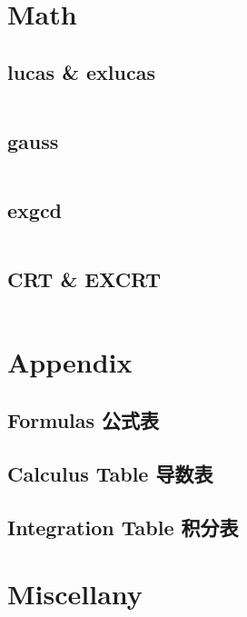 \documentclass[titlepage, a4paper]{article}
\begin{document}
\begin{multicols}{2}
\begin{spacing}{0.6}
			\section{Math}
				\subsection{lucas \& exlucas}
					\inputminted{cpp}{src/Math Combinatorics/exlucas.cpp}
				\subsection{gauss}
					\inputminted{cpp}{src/Math Combinatorics/gauss.cpp}
				\subsection{exgcd}
					\inputminted{cpp}{src/Math Combinatorics/exgcd.cpp}
				\subsection{CRT \& EXCRT} 
					\inputminted{cpp}{src/Math Combinatorics/CRT.cpp}

			\section{Appendix}
				\begin{spacing}{0.5}
				\subsection{Formulas 公式表}
					
				\subsection{Calculus Table 导数表}
					
				\subsection{Integration Table 积分表}
					
				\end{spacing}
			\section{Miscellany}

\end{spacing}
\end{multicols}
\end{document}
